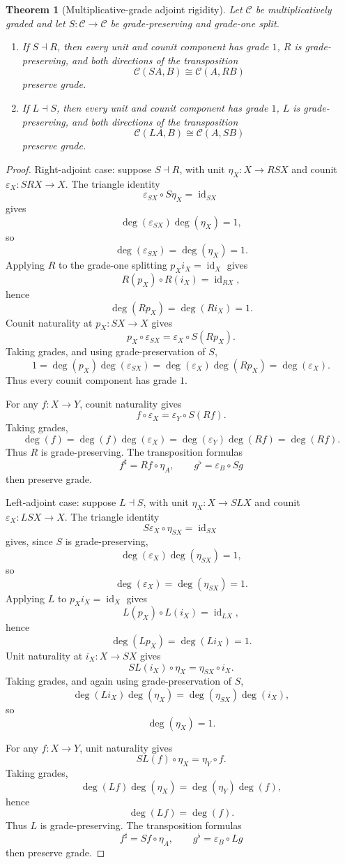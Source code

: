 \documentclass[11pt]{article}
\newtheorem{theorem}{Theorem}[section]
\DeclareMathOperator{\id}{id}
\begin{document}
\begin{theorem}[Multiplicative-grade adjoint rigidity]
\label{thm:abstract-grade-rigidity}
Let $\mathcal C$ be multiplicatively graded and let
$S:\mathcal C\to\mathcal C$ be grade-preserving and grade-one split.
\begin{enumerate}
\item If $S\dashv R$, then every unit and counit component has grade $1$,
$R$ is grade-preserving, and both directions of the transposition
\[
\mathcal C(SA,B)\cong\mathcal C(A,RB)
\]
preserve grade.
\item If $L\dashv S$, then every unit and counit component has grade $1$,
$L$ is grade-preserving, and both directions of the transposition
\[
\mathcal C(LA,B)\cong\mathcal C(A,SB)
\]
preserve grade.
\end{enumerate}
\end{theorem}

\begin{proof}
Right-adjoint case: suppose $S\dashv R$, with unit
$\eta_X:X\to RSX$ and counit $\varepsilon_X:SRX\to X$. The triangle identity
\[
\varepsilon_{SX}\circ S\eta_X=\id_{SX}
\]
gives
\[
\deg(\varepsilon_{SX})\deg(\eta_X)=1,
\]
so
\[
\deg(\varepsilon_{SX})=\deg(\eta_X)=1.
\]
Applying $R$ to the grade-one splitting $p_Xi_X=\id_X$ gives
\[
R(p_X)\circ R(i_X)=\id_{RX},
\]
hence
\[
\deg(Rp_X)=\deg(Ri_X)=1.
\]
Counit naturality at $p_X:SX\to X$ gives
\[
p_X\circ\varepsilon_{SX}
=
\varepsilon_X\circ S(Rp_X).
\]
Taking grades, and using grade-preservation of $S$,
\[
1
=
\deg(p_X)\deg(\varepsilon_{SX})
=
\deg(\varepsilon_X)\deg(Rp_X)
=
\deg(\varepsilon_X).
\]
Thus every counit component has grade $1$.

For any $f:X\to Y$, counit naturality gives
\[
f\circ\varepsilon_X
=
\varepsilon_Y\circ S(Rf).
\]
Taking grades,
\[
\deg(f)
=
\deg(f)\deg(\varepsilon_X)
=
\deg(\varepsilon_Y)\deg(Rf)
=
\deg(Rf).
\]
Thus $R$ is grade-preserving. The transposition formulas
\[
f^\sharp=Rf\circ\eta_A,
\qquad
g^\flat=\varepsilon_B\circ Sg
\]
then preserve grade.

Left-adjoint case: suppose $L\dashv S$, with unit
$\eta_X:X\to SLX$ and counit $\varepsilon_X:LSX\to X$. The triangle identity
\[
S\varepsilon_X\circ\eta_{SX}=\id_{SX}
\]
gives, since $S$ is grade-preserving,
\[
\deg(\varepsilon_X)\deg(\eta_{SX})=1,
\]
so
\[
\deg(\varepsilon_X)=\deg(\eta_{SX})=1.
\]
Applying $L$ to $p_Xi_X=\id_X$ gives
\[
L(p_X)\circ L(i_X)=\id_{LX},
\]
hence
\[
\deg(Lp_X)=\deg(Li_X)=1.
\]
Unit naturality at $i_X:X\to SX$ gives
\[
SL(i_X)\circ\eta_X
=
\eta_{SX}\circ i_X.
\]
Taking grades, and again using grade-preservation of $S$,
\[
\deg(Li_X)\deg(\eta_X)
=
\deg(\eta_{SX})\deg(i_X),
\]
so
\[
\deg(\eta_X)=1.
\]

For any $f:X\to Y$, unit naturality gives
\[
SL(f)\circ\eta_X
=
\eta_Y\circ f.
\]
Taking grades,
\[
\deg(Lf)\deg(\eta_X)
=
\deg(\eta_Y)\deg(f),
\]
hence
\[
\deg(Lf)=\deg(f).
\]
Thus $L$ is grade-preserving. The transposition formulas
\[
f^\sharp=Sf\circ\eta_A,
\qquad
g^\flat=\varepsilon_B\circ Lg
\]
then preserve grade.
\end{proof}
\end{document}
